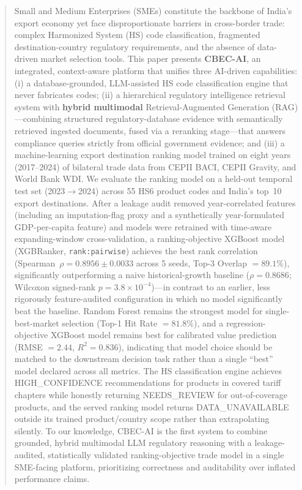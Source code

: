 \documentclass[conference]{IEEEtran}
\newcommand{\arrowto}{$\rightarrow$}
\begin{document}
\begin{abstract}
Small and Medium Enterprises (SMEs) constitute the backbone of India's
export economy yet face disproportionate barriers in cross-border trade:
complex Harmonized System (HS) code classification, fragmented
destination-country regulatory requirements, and the absence of
data-driven market selection tools. This paper presents \textbf{CBEC-AI},
an integrated, context-aware platform that unifies three AI-driven
capabilities: (i) a database-grounded, LLM-assisted HS code
classification engine that never fabricates codes; (ii) a hierarchical
regulatory intelligence retrieval system with \textbf{hybrid multimodal}
Retrieval-Augmented Generation (RAG)---combining structured
regulatory-database evidence with semantically retrieved ingested
documents, fused via a reranking stage---that answers compliance queries
strictly from official government evidence; and (iii) a machine-learning
export destination ranking model trained on eight years (2017--2024) of
bilateral trade data from CEPII BACI, CEPII Gravity, and World Bank WDI.
We evaluate the ranking model on a held-out temporal test set
(2023\arrowto 2024) across 55 HS6 product codes and India's top~10 export
destinations. After a leakage audit removed year-correlated features
(including an imputation-flag proxy and a synthetically year-formulated
GDP-per-capita feature) and models were retrained with time-aware
expanding-window cross-validation, a ranking-objective XGBoost model
(XGBRanker, \texttt{rank:pairwise}) achieves the best rank correlation
(Spearman~$\rho = 0.8956 \pm 0.0033$ across 5 seeds, Top-3 Overlap
$= 89.1\%$), significantly outperforming a naive historical-growth
baseline ($\rho = 0.8686$; Wilcoxon signed-rank $p = 3.8\times10^{-4}$)---in
contrast to an earlier, less rigorously feature-audited configuration in
which no model significantly beat the baseline. Random Forest remains the
strongest model for single-best-market selection (Top-1 Hit Rate
$= 81.8\%$), and a regression-objective XGBoost model remains best for
calibrated value prediction (RMSE $= 2.44$, $R^2 = 0.836$), indicating
that model choice should be matched to the downstream decision task rather
than a single ``best'' model declared across all metrics. The HS
classification engine achieves HIGH\_CONFIDENCE recommendations for
products in covered tariff chapters while honestly returning
NEEDS\_REVIEW for out-of-coverage products, and the served ranking model
returns DATA\_UNAVAILABLE outside its trained product/country scope rather
than extrapolating silently. To our knowledge, CBEC-AI is the first system
to combine grounded, hybrid multimodal LLM regulatory reasoning with a
leakage-audited, statistically validated ranking-objective trade model in
a single SME-facing platform, prioritizing correctness and auditability
over inflated performance claims.
\end{abstract}
\end{document}
